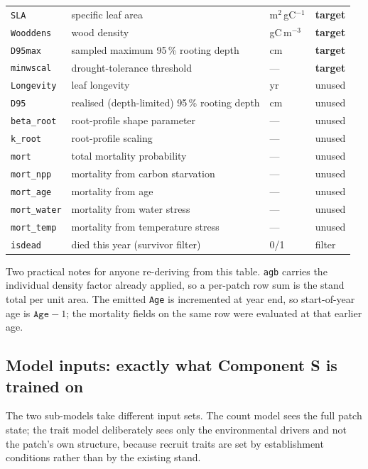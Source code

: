 \documentclass[11pt]{article}
\begin{document}
\begin{table}[h]
\begin{tabular}{llll}
\midrule
\texttt{SLA} & specific leaf area & m$^2$\,gC$^{-1}$ & \textbf{target} \\
\texttt{Wooddens} & wood density & gC\,m$^{-3}$ & \textbf{target} \\
\texttt{D95max} & sampled maximum 95\,\% rooting depth & cm & \textbf{target} \\
\texttt{minwscal} & drought-tolerance threshold & --- & \textbf{target} \\
\texttt{Longevity} & leaf longevity & yr & unused \\
\texttt{D95} & realised (depth-limited) 95\,\% rooting depth & cm & unused \\
\texttt{beta\_root} & root-profile shape parameter & --- & unused \\
\texttt{k\_root} & root-profile scaling & --- & unused \\
\midrule
\texttt{mort} & total mortality probability & --- & unused \\
\texttt{mort\_npp} & mortality from carbon starvation & --- & unused \\
\texttt{mort\_age} & mortality from age & --- & unused \\
\texttt{mort\_water} & mortality from water stress & --- & unused \\
\texttt{mort\_temp} & mortality from temperature stress & --- & unused \\
\texttt{isdead} & died this year (survivor filter) & 0/1 & filter \\
\bottomrule
\end{tabular}
\end{table}

Two practical notes for anyone re-deriving from this table. \texttt{agb} carries the individual density factor already applied, so a per-patch row sum is the stand total per unit area. The emitted \texttt{Age} is incremented at year end, so start-of-year age is $\texttt{Age}-1$; the mortality fields on the same row were evaluated at that earlier age.

\subsection{Model inputs: exactly what Component S is trained on}
\label{sec:inputs}

The two sub-models take different input sets. The count model sees the full patch state; the trait model deliberately sees only the environmental drivers and not the patch's own structure, because recruit traits are set by establishment conditions rather than by the existing stand.
\end{document}
